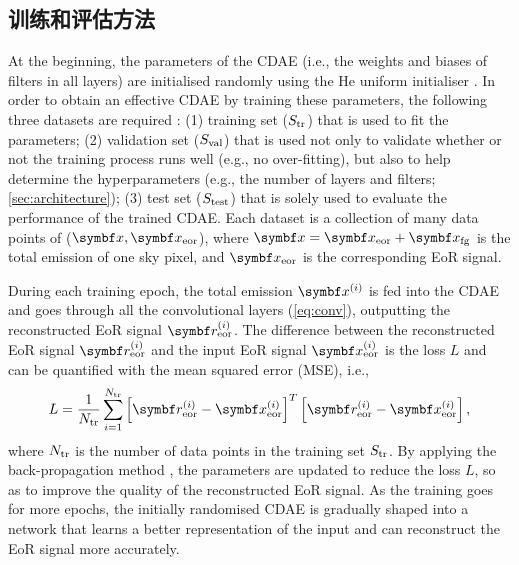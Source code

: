 \subsection{训练和评估方法}
\label{sec:train-eval}

At the beginning, the parameters of the CDAE (i.e., the weights and biases
of filters in all layers) are initialised randomly using the He uniform
initialiser \cite{he2015}.
In order to obtain an effective CDAE by
training these parameters, the
following three datasets are required \cite{ripley1996}:
(1) training set ($S_{\mathrm{tr}}$) that is used to fit the parameters;
(2) validation set ($S_{\mathrm{val}}$)
that is used not only to validate whether or not the training
process runs well (e.g., no over-fitting), but also to
help determine the hyperparameters (e.g., the number of layers and filters;
\autoref{sec:architecture});
(3) test set ($S_{\mathrm{test}}$) that is solely used to evaluate the
performance of the trained CDAE.
Each dataset is a collection of many data points of
($\B{x}, \B{x}_{\R{eor}}$),
where $\B{x} = \B{x}_{\R{eor}} + \B{x}_{\R{fg}}$ is the total emission of
one sky pixel, and $\B{x}_{\R{eor}}$ is the corresponding EoR signal.

During each training epoch, the total emission $\B{x}^{(i)}$ is fed into
the CDAE and goes through all the convolutional layers (\autoref{eq:conv}),
outputting the reconstructed EoR signal $\B{r}^{(i)}_{\R{eor}}$.
The difference between the reconstructed EoR signal $\B{r}^{(i)}_{\R{eor}}$
and the input EoR signal $\B{x}^{(i)}_{\R{eor}}$ is the loss $L$ and can be
quantified with the mean squared error (MSE), i.e.,
\begin{equation}
  \label{eq:loss}
  L = \frac{1}{N_{\R{tr}}} \sum_{i=1}^{N_{\R{tr}}}
    \left[ \B{r}_{\R{eor}}^{(i)} - \B{x}_{\R{eor}}^{(i)} \right]^T
    \left[ \B{r}_{\R{eor}}^{(i)} - \B{x}_{\R{eor}}^{(i)} \right],
\end{equation}
where $N_{\mathrm{tr}}$ is the number of data points in the training set
$S_{\mathrm{tr}}$.
By applying the back-propagation method
\cite{rumelhart1986,lecun1998bp},
the parameters are updated to reduce the loss $L$, so as to
improve the quality of the reconstructed EoR signal.
As the training goes for more epochs, the initially randomised CDAE is
gradually shaped into a network
that learns a better representation of the input and can
reconstruct the EoR signal more accurately.

